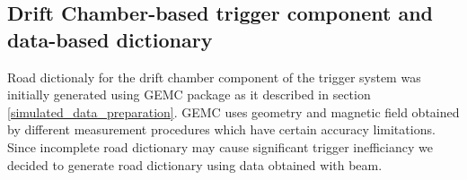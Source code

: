 \subsection{Drift Chamber-based trigger component and data-based dictionary}

Road dictionaly for the drift chamber component of the trigger system was initially generated using GEMC package as it described in section \ref{simulated_data_preparation}. GEMC uses geometry and magnetic field obtained by different measurement procedures which have certain accuracy limitations. Since incomplete road dictionary may cause significant trigger inefficiancy we decided to generate road dictionary using data obtained with beam.